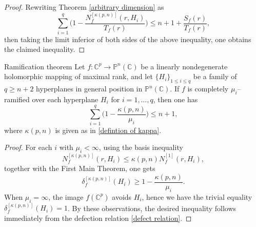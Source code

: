 \documentclass[english, 12pt]{amsart}
\theoremstyle{plain}
\theoremstyle{remark}
\numberwithin{equation}{section}
\theoremstyle{plain}
\newcommand{\thistheoremname}{}
\newtheorem*{genericthm*}{\thistheoremname}
\newenvironment{namedthm*}[1]{\renewcommand{\thistheoremname}{#1}%
	\begin{genericthm*}}
	{\end{genericthm*}}
\theoremstyle{named}
\begin{document}
\begin{proof}
Rewriting Theorem \ref{arbitrary dimension}  as
\[
\sum_{i=1}^q
\bigg(
1-
\dfrac{N_f^{[\kappa(p,n)]}(r,H_i)}{T_{f}(r)}
\bigg)
\leq
n+1
+
\dfrac{S_{f}(r)}{T_{f}(r)},
\]
then taking the limit inferior of both sides of the above inequality, one obtains the claimed inequality.
\end{proof}
	
\begin{namedthm*}{Ramification theorem}
Let $f:\mathbb{C}^p\rightarrow\mathbb{P}^n(\mathbb{C})$ be a linearly nondegenerate holomorphic mapping of maximal rank, and let $\{H_i\}_{1\leq i\leq q}$ be a family of $q\geq n+2$ hyperplanes in general position in $\mathbb{P}^n(\mathbb{C})$. If $f$ is completely $\mu_{i}$--ramified over each  hyperplane $H_i$ for $i=1,\dots, q$, then one has
\[
\label{ramification theorem statement}
\sum_{i=1}^q
\bigg(
1
-
\dfrac{\kappa(p,n)}{\mu_{i}}
\bigg) 
\leq
n+1,
\]
where $\kappa(p,n)$ is given as in \eqref{defintion of kappa}.
\end{namedthm*}
\begin{proof}
For each $i$ with $\mu_i<\infty$, using the basis inequality
$$
N_f^{[\kappa(p,n)]}(r,H_i)
\leq
\kappa(p,n)
N_f^{[1]}(r,H_i),
$$
together with the First Main Theorem, one gets
\[
\delta_{f}^{[\kappa(p,n)]}(H_i)
\geq
1-\dfrac{\kappa(p,n)}{\mu_i}.
\]
When $\mu_i=\infty$, the image $f(\mathbb{C}^p)$ avoids $H_i$, hence we have the trivial equality $\delta_{f}^{[\kappa(p,n)]}(H_i)=1$. By these observations, the desired inequality follows immediately from the defection relation \eqref{defect relation}.
\end{proof}
\end{document}
